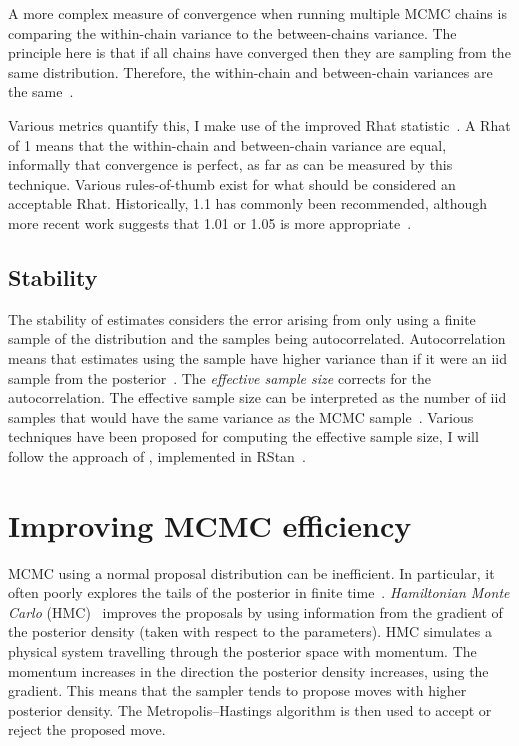 \documentclass[thesis.tex]{subfiles}
\begin{document}
A more complex measure of convergence when running multiple MCMC chains is comparing the within-chain variance to the between-chains variance.
The principle here is that if all chains have converged then they are sampling from the same distribution.
Therefore, the within-chain and between-chain variances are the same~\autocite[82]{brooksMCMCNotes}.

Various metrics quantify this, I make use of the improved Rhat statistic~\autocite{vehtariRhat}.
A Rhat of 1 means that the within-chain and between-chain variance are equal, informally that convergence is perfect, as far as can be measured by this technique.
Various rules-of-thumb exist for what should be considered an acceptable Rhat.
Historically, 1.1 has commonly been recommended, although more recent work suggests that 1.01 or 1.05 is more appropriate~\autocite{vehtariRhat}.

\subsection{Stability} \label{MCMC:sec:stability}

The stability of estimates considers the error arising from only using a finite sample of the distribution and the samples being autocorrelated.
Autocorrelation means that estimates using the sample have higher variance than if it were an iid sample from the posterior~\autocite[286]{gelmanBDA}.
The \emph{effective sample size} corrects for the autocorrelation.
The effective sample size can be interpreted as the number of iid samples that would have the same variance as the MCMC sample~\autocites[286]{gelmanBDA}{vehtariRhat}.
Various techniques have been proposed for computing the effective sample size, I will follow the approach of \textcite{vehtariRhat}, implemented in RStan~\autocite{RStan-2-32-3}.

\section{Improving MCMC efficiency} \label{MCMC:sec:improving}

MCMC using a normal proposal distribution can be inefficient.
In particular, it often poorly explores the tails of the posterior in finite time~\autocite[e.g.][]{turitsynIrreversible}.
\emph{Hamiltonian Monte Carlo} (HMC)~\autocite{nealMCMC,nealImproved,duaneHybrid} improves the proposals by using information from the gradient of the posterior density (taken with respect to the parameters).
HMC simulates a physical system travelling through the posterior space with momentum.
The momentum increases in the direction the posterior density increases, using the gradient.
This means that the sampler tends to propose moves with higher posterior density.
The Metropolis--Hastings algorithm is then used to accept or reject the proposed move.
\end{document}

